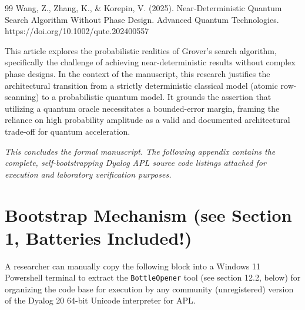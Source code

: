 \documentclass[11pt]{article}
\begin{document}
\begin{thebibliography}{99}
  Wang, Z., Zhang, K., & Korepin, V. (2025). Near‐Deterministic Quantum Search Algorithm Without Phase Design. Advanced Quantum Technologies. https://doi.org/10.1002/qute.202400557

    This article explores the probabilistic realities of Grover’s search algorithm, specifically the challenge of achieving near-deterministic results without complex phase designs. In the context of the manuscript, this research justifies the architectural transition from a strictly deterministic classical model (atomic row-scanning) to a probabilistic quantum model. It grounds the assertion that utilizing a quantum oracle necessitates a bounded-error margin, framing the reliance on high probability amplitude as a valid and documented architectural trade-off for quantum acceleration.

\end{thebibliography}

\vspace{3em}
\noindent\hrulefill
\vspace{0.5em}

\begin{center}
  \small\itshape
  This concludes the formal manuscript. The following appendix contains the complete, 
  self-bootstrapping Dyalog APL source code listings attached for execution 
  and laboratory verification purposes.
\end{center}

\vspace{0.5em}
\noindent\hrulefill
\pagestyle{empty}

\newpage
\appendix %

\section{Bootstrap Mechanism (see Section 1, Batteries Included!)}

A researcher can manually copy the following block into a Windows 11 Powershell terminal to extract the \texttt{BottleOpener} tool (see section 12.2, below) for organizing the code base for execution by any community (unregistered) version of the Dyalog 20 64-bit Unicode interpreter for APL.
\end{document}
